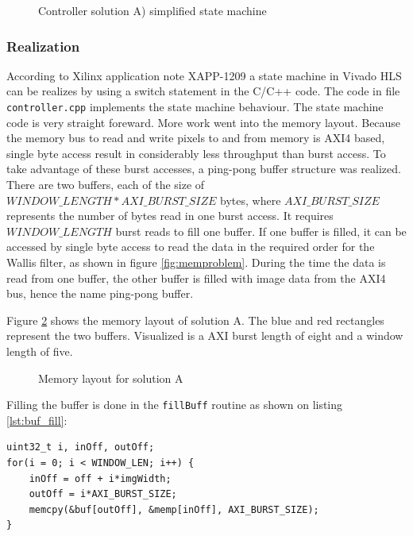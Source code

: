 \begin{figure}[H]
    \centering
    \begin{adjustbox}{scale=1}
        
    \end{adjustbox}
    \caption{Controller solution A) simplified state machine}
    \label{fig:controllerfsm}
\end{figure}

\subsubsection*{Realization}
According to Xilinx application note XAPP-1209 \cite{xapp1209} a state
machine in Vivado HLS can be realizes by using a switch statement in the C/C++
code.
The code in file \texttt{controller.cpp} implements the state machine behaviour.
The state machine code is very straight foreward. More work went into the memory
layout. Because the memory bus to read and write pixels to and from memory is
AXI4 based, single byte access result in considerably less throughput than
burst access.
To take advantage of these burst accesses, a ping-pong buffer structure was
realized. There are two buffers, each of the size of $WINDOW\_LENGTH *
AXI\_BURST\_SIZE$ bytes, where $AXI\_BURST\_SIZE$ represents the number of bytes
read
in one burst access. It requires $WINDOW\_LENGTH$ burst reads to fill one
buffer. If one buffer is filled, it can be accessed by single byte access to
read the data in the required order for the Wallis filter, as shown in figure
\ref{fig:memproblem}. During the time the data is read from one buffer, the
other buffer is filled with image data from the AXI4 bus, hence the name
ping-pong buffer. 

Figure \ref{fig:solamemlayout} shows the memory layout of
solution A. The blue and red rectangles represent the two buffers. Visualized is
a AXI burst length of eight and a window length of five.

\begin{figure}[tb!]
    \centering
    \begin{adjustbox}{scale=0.7}
        
    \end{adjustbox}
    \caption{Memory layout for solution A}
    \label{fig:solamemlayout}
\end{figure}

Filling the buffer is done in the \texttt{fillBuff} routine
as shown on listing \ref{lst:buf_fill}:

\begin{minipage}{\textwidth}
\begin{lstlisting}[style=CStyle, caption=Buffer fill simplified,
label=lst:buf_fill]
uint32_t i, inOff, outOff;
for(i = 0; i < WINDOW_LEN; i++) {
    inOff = off + i*imgWidth;
    outOff = i*AXI_BURST_SIZE;
    memcpy(&buf[outOff], &memp[inOff], AXI_BURST_SIZE);
}\end{lstlisting}
\end{minipage}

